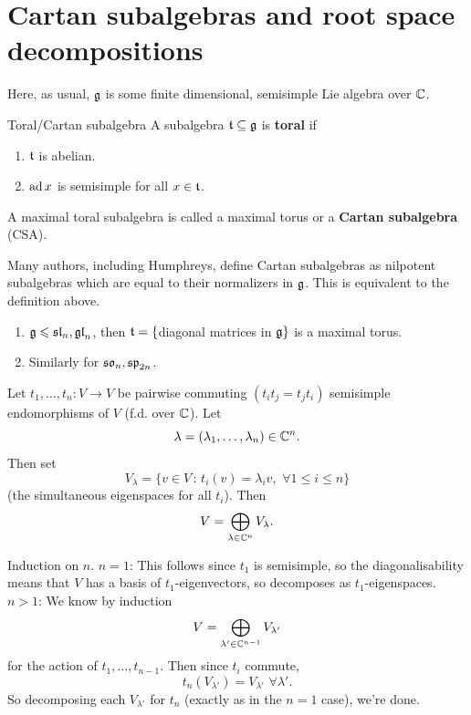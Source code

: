 \documentclass{article}
\begin{document}
\section{Cartan subalgebras and root space decompositions}
Here, as usual, $\mathfrak{g}$ is some finite dimensional, semisimple Lie algebra over $\mathbb{C}$.
\begin{fancydefine}{Toral/Cartan subalgebra}
    A subalgebra $\mathfrak{t} \subseteq \mathfrak{g}$ is \textbf{toral} if \begin{enumerate}
        \item $\mathfrak{t}$ is abelian.
        \item $\operatorname{ad} x$ is semisimple for all $x \in \mathfrak{t}$.
    \end{enumerate}
    A maximal toral subalgebra is called a maximal torus or a \textbf{Cartan subalgebra} (CSA).
\end{fancydefine}
\begin{remark*}
    Many authors, including Humphreys, define Cartan subalgebras as nilpotent subalgebras which are equal to their normalizers in $\mathfrak{g}$. This is equivalent to the definition above.
\end{remark*}
\begin{exs*}\hspace{0.1cm}
    \begin{enumerate}
        \item $\mathfrak{g} \leqslant \mathfrak{sl}_{n}, \mathfrak{gl}_{n}$, then $\mathfrak{t} = \{$diagonal matrices in $\mathfrak{g}\}$ is a maximal torus.
        \item Similarly for $\mathfrak{so}_{n}, \mathfrak{sp}_{2n}$.
    \end{enumerate}
\end{exs*}
\begin{fancylem}{}
    Let $t_{1}, \dots, t_{n} : V \to V$ be pairwise commuting $(t_{i}t_{j} = t_{j}t_{i})$ semisimple endomorphisms of $V$ (f.d. over $\mathbb{C}$). Let \[ \lambda = (\lambda_{1}, \dots, \lambda_{n}) \in \mathbb{C}^{n}.\]
    Then set \[V_{\lambda}=\{ v \in V \, : \, t_{i}(v) = \lambda_{i}v, \, \, \forall 1 \leq i \leq n \} \]
    (the simultaneous eigenspaces for all $t_{i}$). Then \[ V = \bigoplus_{\lambda \in \mathbb{C}^{n}} V_{\lambda}.\] 
\end{fancylem}
\proof Induction on $n$. 
\gap \underline{$n=1$}: \gap This follows since $t_{1}$ is semisimple, so the diagonalisability means that $V$ has a basis of $t_{1}$-eigenvectors, so decomposes as $t_{1}$-eigenspaces. 
\gap \underline{$n>1$}: \gap We know by induction \[ V = \bigoplus_{\lambda' \in \mathbb{C}^{n-1}} V_{\lambda'}\] for the action of $t_{1}, \dots, t_{n-1}$. Then since $t_{i}$ commute, \[t_{n}(V_{\lambda'}) = V_{\lambda'} \, \, \forall \lambda'.\] So decomposing each $V_{\lambda'}$ for $t_{n}$ (exactly as in the $n=1$ case), we're done. 
\end{document}
